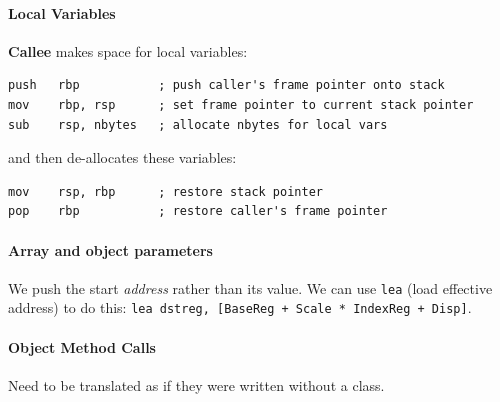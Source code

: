 \documentclass[twocolumn,english]{article}
\begin{document}
\paragraph{Local Variables}

\textbf{Callee} makes space for local variables:

\noindent 
\begin{lstlisting}[basicstyle={\footnotesize\ttfamily},frame=single]
push   rbp           ; push caller's frame pointer onto stack
mov    rbp, rsp      ; set frame pointer to current stack pointer
sub    rsp, nbytes   ; allocate nbytes for local vars
\end{lstlisting}


and then de-allocates these variables:

\noindent 
\begin{lstlisting}[basicstyle={\footnotesize\ttfamily},frame=single]
mov    rsp, rbp      ; restore stack pointer
pop    rbp           ; restore caller's frame pointer
\end{lstlisting}



\paragraph{Array and object parameters}

We push the start \emph{address} rather than its value. We can use
\texttt{lea} (load effective address) to do this: \texttt{lea dstreg,
{[}BaseReg + Scale {*} IndexReg + Disp{]}}.


\paragraph{Object Method Calls}

Need to be translated as if they were written without a class.
\end{document}
